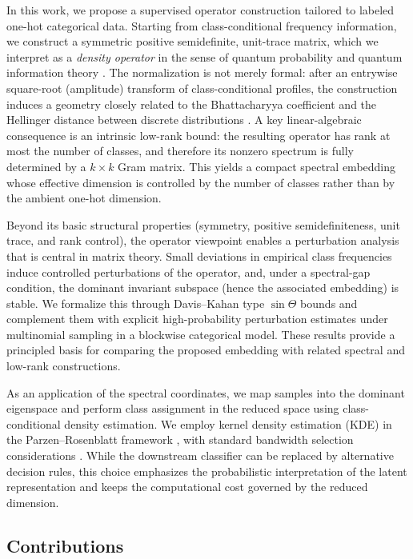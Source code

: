 \documentclass[preprint,11pt]{elsarticle}
\begin{document}
In this work, we propose a supervised operator construction tailored to labeled one-hot categorical data.
Starting from class-conditional frequency information, we construct a symmetric positive semidefinite, unit-trace matrix, which we interpret as a \emph{density operator} in the sense of quantum probability and quantum information theory \cite{NielsenChuang2000,Holevo2001}.
The normalization is not merely formal: after an entrywise square-root (amplitude) transform of class-conditional profiles, the construction induces a geometry closely related to the Bhattacharyya coefficient and the Hellinger distance between discrete distributions \cite{Bhattacharyya1943,Aherne1998}.
A key linear-algebraic consequence is an intrinsic low-rank bound: the resulting operator has rank at most the number of classes, and therefore its nonzero spectrum is fully determined by a $k\times k$ Gram matrix.
This yields a compact spectral embedding whose effective dimension is controlled by the number of classes rather than by the ambient one-hot dimension.

Beyond its basic structural properties (symmetry, positive semidefiniteness, unit trace, and rank control), the operator viewpoint enables a perturbation analysis that is central in matrix theory.
Small deviations in empirical class frequencies induce controlled perturbations of the operator, and, under a spectral-gap condition, the dominant invariant subspace (hence the associated embedding) is stable.
We formalize this through Davis--Kahan type $\sin\Theta$ bounds \cite{DavisKahan1970,YuWangSamworth2015} and complement them with explicit high-probability perturbation estimates under multinomial sampling in a blockwise categorical model.
These results provide a principled basis for comparing the proposed embedding with related spectral and low-rank constructions.

As an application of the spectral coordinates, we map samples into the dominant eigenspace and perform class assignment in the reduced space using class-conditional density estimation.
We employ kernel density estimation (KDE) in the Parzen--Rosenblatt framework \cite{Rosenblatt1956,Parzen1962}, with standard bandwidth selection considerations \cite{Silverman1986,Scott2015,WandJones1995}.
While the downstream classifier can be replaced by alternative decision rules, this choice emphasizes the probabilistic interpretation of the latent representation and keeps the computational cost governed by the reduced dimension.

\subsection{Contributions}
\end{document}
